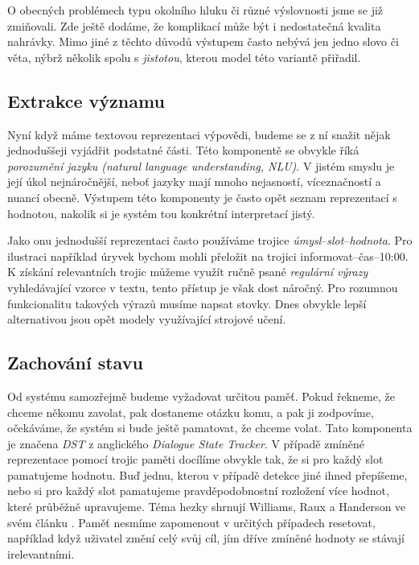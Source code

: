 O obecných problémech typu okolního hluku či různé výslovnosti jsme se
již zmiňovali. Zde ještě dodáme, že komplikací může být i nedostatečná kvalita
nahrávky. Mimo jiné z těchto důvodů výstupem často nebývá jen jedno
slovo či věta, nýbrž několik spolu s \textit{jistotou}, kterou model této
variantě přiřadil.

\subsection{Extrakce významu}

Nyní když máme textovou reprezentaci výpovědi, budeme se z ní snažit nějak
jednoduššeji vyjádřit podstatné části. Této komponentě se obvykle říká
\textit{porozumění jazyku (natural language understanding, NLU)}. V jistém
smyslu je její úkol nejnáročnější, neboť jazyky mají mnoho nejasností,
víceznačností a nuancí obecně. Výstupem této komponenty je často opět
seznam reprezentací s hodnotou, nakolik si je systém tou konkrétní
interpretací jistý.

Jako onu jednodušší reprezentaci často používáme trojice
\textit{úmysl}--\textit{slot}--\textit{hodnota}. Pro ilustraci například
úryvek  bychom mohli přeložit na trojici
informovat--čas--10:00. K získání relevantních trojic můžeme využít ručně
psané \textit{regulární výrazy} vyhledávající vzorce v textu, tento přístup
je však dost náročný. Pro rozumnou funkcionalitu takových výrazů musíme napsat
stovky. Dnes obvykle lepší alternativou jsou opět modely využívající strojové
učení.

\subsection{Zachování stavu}

Od systému samozřejmě budeme vyžadovat určitou paměť. Pokud řekneme, že
chceme někomu zavolat, pak dostaneme otázku komu, a pak ji zodpovíme, očekáváme,
že systém si bude ještě pamatovat, že chceme volat. Tato komponenta je
značena \textit{DST} z anglického \textit{Dialogue State Tracker}. V případě
zmíněné reprezentace pomocí trojic paměti docílíme obvykle tak, že si pro každý
slot pamatujeme hodnotu. Buď jednu, kterou v případě detekce jiné ihned přepíšeme,
nebo si pro každý slot pamatujeme pravděpodobnostní rozložení více hodnot, které
průběžně upravujeme. Téma hezky shrnují Williams, Raux a Handerson ve svém článku
\citep{williams_dialog_2016}. Paměť nesmíme zapomenout v určitých případech
resetovat, například když uživatel změní celý svůj cíl, jím dříve
zmíněné hodnoty se stávají irelevantními.